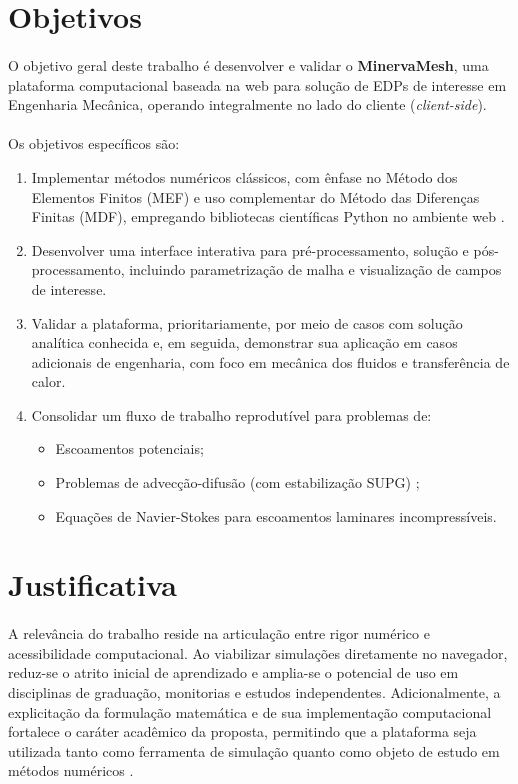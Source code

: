 \section{Objetivos}

\paragraph{}O objetivo geral deste trabalho é desenvolver e validar o \textbf{MinervaMesh}, uma plataforma computacional baseada na web para solução de EDPs de interesse em Engenharia Mecânica, operando integralmente no lado do cliente (\textit{client-side}).

\paragraph{}Os objetivos específicos são:
\begin{enumerate}
    \item Implementar métodos numéricos clássicos, com ênfase no Método dos Elementos Finitos (MEF) e uso complementar do Método das Diferenças Finitas (MDF), empregando bibliotecas científicas Python no ambiente web \cite{Harris2020}.
    \item Desenvolver uma interface interativa para pré-processamento, solução e pós-processamento, incluindo parametrização de malha e visualização de campos de interesse.
    \item Validar a plataforma, prioritariamente, por meio de casos com solução analítica conhecida e, em seguida, demonstrar sua aplicação em casos adicionais de engenharia, com foco em mecânica dos fluidos e transferência de calor.
    \item Consolidar um fluxo de trabalho reprodutível para problemas de:
    \begin{itemize}
        \item Escoamentos potenciais;
        \item Problemas de advecção-difusão (com estabilização SUPG) \cite{Brooks1982};
        \item Equações de Navier-Stokes para escoamentos laminares incompressíveis.
    \end{itemize}
\end{enumerate}

\section{Justificativa}

\paragraph{}A relevância do trabalho reside na articulação entre rigor numérico e acessibilidade computacional. Ao viabilizar simulações diretamente no navegador, reduz-se o atrito inicial de aprendizado e amplia-se o potencial de uso em disciplinas de graduação, monitorias e estudos independentes. Adicionalmente, a explicitação da formulação matemática e de sua implementação computacional fortalece o caráter acadêmico da proposta, permitindo que a plataforma seja utilizada tanto como ferramenta de simulação quanto como objeto de estudo em métodos numéricos \cite{Fish2007,Reddy2005}.

